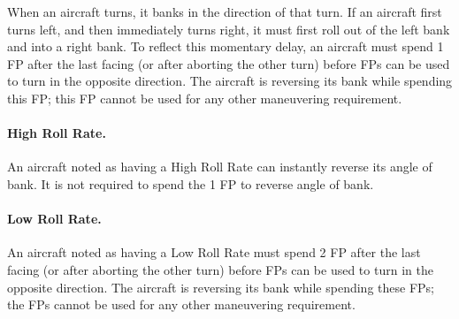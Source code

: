 \begin{advancedrules}
When an aircraft turns, it banks in the direction of that turn.  If an aircraft first turns left, and then immediately turns right, it must first roll out of the left bank and into a right bank. To reflect this momentary delay, an aircraft must spend 1 FP after the last facing (or after aborting the other turn) before FPs can be used to turn in the opposite direction. The aircraft is reversing its bank while spending this FP; this FP cannot be used for any other maneuvering requirement.

\paragraph{High Roll Rate.} 
An aircraft noted as having a High Roll Rate can instantly reverse its angle of bank. It is not required to spend the 1 FP to reverse angle of bank. 

\paragraph{Low Roll Rate.} 
An aircraft noted as having a Low Roll Rate must spend 2 FP after the last facing (or after aborting the other turn) before FPs can be used to turn in the opposite direction. The aircraft is reversing its bank while spending these FPs; the FPs cannot be used for any other maneuvering requirement.




\end{advancedrules}
